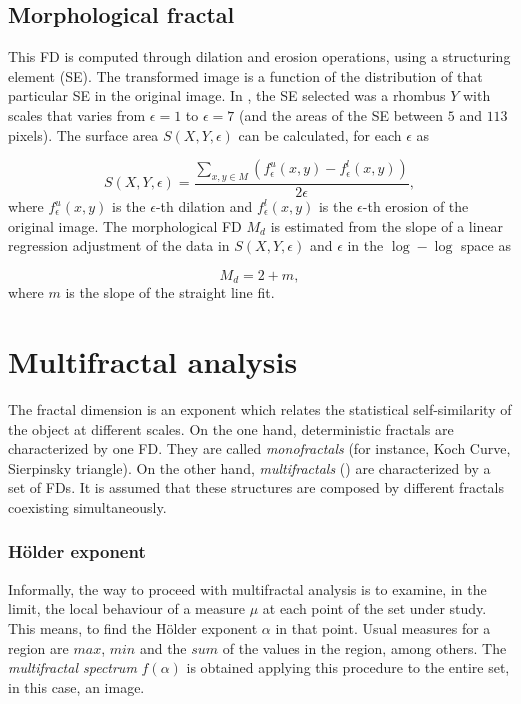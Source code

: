 \documentclass[oneside,a4paper,english,links]{article}
\begin{document}
\subsection{Morphological fractal}
This FD is computed through dilation and erosion operations, using a structuring element (SE). The transformed image is a function of the distribution of that particular SE in the original image.  In \cite{Gonzales2008}, the SE selected was a rhombus $Y$ with scales that varies from $\epsilon = 1$ to $\epsilon = 7$ (and the areas of the SE between $5$ and $113$ pixels). The surface area $S(X,Y,\epsilon)$ can be calculated, for each $\epsilon$ as

\begin{equation}
S(X,Y,\epsilon) = \frac{\sum_{x,y \in M} (f_{\epsilon}^{u}(x,y) - f_{\epsilon}^{l}(x,y))}{2\epsilon},
\label{eqn:eqn2}
\end{equation}
\noindent
where $f_{\epsilon}^{u}(x,y)$ is the $\epsilon$-th dilation and $f_{\epsilon}^{l}(x,y)$ is the $\epsilon$-th erosion of the original image. The morphological FD $M_{d}$ is estimated from the slope of a linear regression adjustment of the data in $S(X,Y,\epsilon)$ and $\epsilon$ in the $\log-\log$ space as

\begin{equation}
M_{d} = 2 + m,
\label{eqn:eqn3}
\end{equation}
\noindent
where $m$ is the slope of the straight line fit.

\section{Multifractal analysis}
The fractal dimension is an exponent which relates the statistical self-similarity of the object at different scales. On the one hand, deterministic fractals are characterized by one FD. They are called {\em monofractals} (for instance, Koch Curve, Sierpinsky triangle). On the other hand, {\em multifractals} (\cite{Mandelbrot89}) are characterized by a set of FDs. It is assumed that these structures are composed by different fractals coexisting simultaneously.

\subsubsection{H\"older exponent}
Informally, the way to proceed with multifractal analysis is to examine, in the limit, the local behaviour of a measure $\mu$ at each point of the set under study. This means, to find the H\"older exponent $\alpha$ in that point. Usual measures for a region are $max$, $min$ and the $sum$ of the values in the region, among others. The {\em multifractal spectrum} $f(\alpha)$ is obtained applying this procedure to the entire set, in this case, an image.
\end{document}
